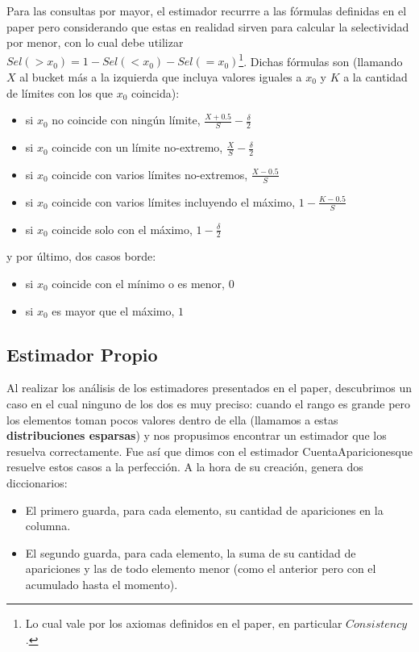 Para las consultas por mayor, el estimador recurrre a las fórmulas definidas en el paper pero considerando que estas en realidad sirven para calcular la selectividad por menor, con lo cual debe utilizar $Sel(>x_0) = 1 - Sel(<x_0) - Sel(=x_0)$\footnote{Lo cual vale por los axiomas definidos en el paper, en particular $Consistency$.}. Dichas fórmulas son (llamando $X$ al bucket más a la izquierda que incluya valores iguales a $x_0$ y $K$ a la cantidad de límites con los que $x_0$ coincida):
\begin{itemize}
 \item si $x_0$ no coincide con ningún límite, $\frac{X+0.5}{S} - \frac{\delta}{2}$
 \item si $x_0$ coincide con un límite no-extremo, $\frac{X}{S} - \frac{\delta}{2}$
 \item si $x_0$ coincide con varios límites no-extremos, $\frac{X-0.5}{S}$
 \item si $x_0$ coincide con varios límites incluyendo el máximo, $1 - \frac{K-0.5}{S}$
 \item si $x_0$ coincide solo con el máximo, $1 - \frac{\delta}{2}$
\end{itemize}
y por último, dos casos borde:
\begin{itemize}
 \item si $x_0$ coincide con el mínimo o es menor, $0$
 \item si $x_0$ es mayor que el máximo, $1$
\end{itemize}

\subsection{Estimador Propio}
Al realizar los análisis de los estimadores presentados en el paper, descubrimos un caso en el cual ninguno de los dos es muy preciso: cuando el rango es grande pero los elementos toman pocos valores dentro de ella (llamamos a estas \textbf{distribuciones esparsas}) y nos propusimos encontrar un estimador que los resuelva correctamente. Fue así que dimos con el estimador CuentaApariciones\texttrademark que resuelve estos casos a la perfección. A la hora de su creación, genera dos diccionarios:
\begin{itemize}
 \item El primero guarda, para cada elemento, su cantidad de apariciones en la columna.
 \item El segundo guarda, para cada elemento, la suma de su cantidad de apariciones y las de todo elemento menor (como el anterior pero con el acumulado hasta el momento).
\end{itemize}

